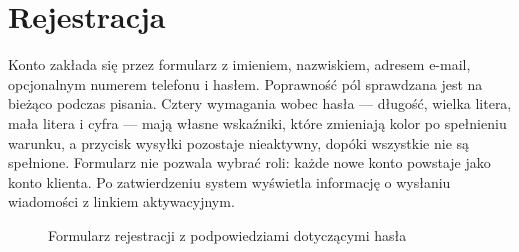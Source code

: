 \section{Rejestracja}
\label{sec:prez-rejestracja}

Konto zakłada się przez formularz z imieniem, nazwiskiem, adresem e-mail, opcjonalnym numerem telefonu i hasłem. Poprawność pól sprawdzana jest na bieżąco podczas pisania. Cztery wymagania wobec hasła — długość, wielka litera, mała litera i cyfra — mają własne wskaźniki, które zmieniają kolor po spełnieniu warunku, a przycisk wysyłki pozostaje nieaktywny, dopóki wszystkie nie są spełnione. Formularz nie pozwala wybrać roli: każde nowe konto powstaje jako konto klienta. Po zatwierdzeniu system wyświetla informację o wysłaniu wiadomości z linkiem aktywacyjnym.

\begin{figure}[htbp]
\centering
\caption{Formularz rejestracji z podpowiedziami dotyczącymi hasła}
\label{fig:prez-rejestracja}
\end{figure}

